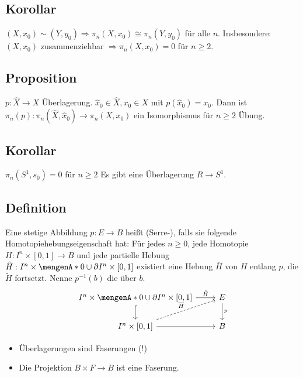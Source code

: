 \subsection{Korollar} %
\label{sub:147}
$(X,x_0) \sim (Y,y_0) \Rightarrow \pi_n(X,x_0) \cong \pi_n(Y,y_0)$ für alle $n$. Insbesondere: $(X,x_0)$ zusammenziehbar $\Rightarrow \pi_n(X,x_0) = 0$ für $n \ge 2$.

\subsection{Proposition} %
\label{sub:148}
$p : \hat{X} \to X$ Überlagerung. $\hat{x}_0 \in \hat{X}, x_0 \in X$ mit $p(\hat{x}_0) = x_0$. Dann ist $\pi_n(p) : \pi_n(\hat{X}, \hat{x}_0) \to \pi_n(X,x_0)$ ein
Isomorphismus für $n \ge 2$
Übung.

\subsection{Korollar} %
\label{sub:149}
$\pi_n(S^1, s_0) = 0$ für $n \ge 2$
Es gibt eine Überlagerung $R \to S^1$. \bewende

\subsection{Definition} %
\label{sub:1410}
Eine stetige Abbildung $p : E \to B$ heißt (Serre-), falls sie folgende Homotopiehebungseigenschaft hat: Für jedes $n \ge 0$, jede Homotopie 
$H : I^n \times [0,1] \to B$ und jede partielle Hebung $\tilde{H} : I^n \times \set{0} \cup \partial I^n \times [0,1]$ existiert eine Hebung $\overline{H}$ von $H$
entlang $p$, die $\tilde{H}$ fortsetzt. Nenne $p ^{-1}(b)$ die  über $b$. 
\[
	\begin{tikzcd}
		I^n \times \set{0} \cup \partial I^n \times [0,1] \rar["\tilde{H}"]  \dar[hook]& E \dar["p"] \\
		I^n \times [0,1] \rar \urar[dashed, "\overline{H} "]& B
	\end{tikzcd}
\]
\begin{itemize}
	\item Überlagerungen sind Faserungen (!)
	\item Die Projektion $B \times F \to B$ ist eine Faserung.
\end{itemize}

